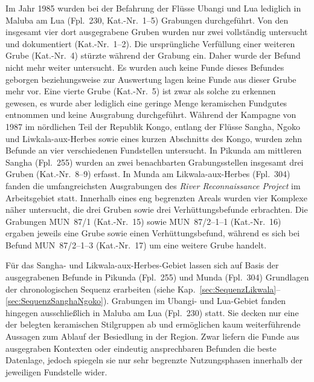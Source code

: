 Im Jahr 1985 wurden bei der Befahrung der Flüsse Ubangi und Lua lediglich in Maluba am Lua (Fpl.~230, Kat.-Nr.~1--5) Grabungen durchgeführt. Von den insgesamt vier dort ausgegrabene Gruben wurden nur zwei vollständig untersucht und dokumentiert (Kat.-Nr.~1--2). Die ursprüngliche Verfüllung einer weiteren Grube (Kat.-Nr.~4) stürzte während der Grabung ein. Daher wurde der Befund nicht mehr weiter untersucht. Es wurden auch keine Funde dieses Befundes geborgen beziehungsweise zur Auswertung lagen keine Funde aus dieser Grube mehr vor. Eine vierte Grube (Kat.-Nr.~5) ist zwar als solche zu erkennen gewesen, es wurde aber lediglich eine geringe Menge keramischen Fundgutes entnommen und keine Ausgrabung durchgeführt. Während der Kampagne von 1987 im nördlichen Teil der Republik Kongo, entlang der Flüsse Sangha, Ngoko und Liwkala-aux-Herbes sowie eines kurzen Abschnitts des Kongo, wurden zehn Befunde an vier verschiedenen Fundstellen untersucht. In Pikunda am mittleren Sangha (Fpl.~255) wurden an zwei benachbarten Grabungsstellen insgesamt drei Gruben (Kat.-Nr.~8--9) erfasst. In Munda am Likwala-aux-Herbes (Fpl.~304) fanden die umfangreichsten Ausgrabungen des \textit{River Reconnaissance Project} im Arbeitsgebiet statt. Innerhalb eines eng begrenzten Areals wurden vier Komplexe näher untersucht, die drei Gruben sowie drei Verhüttungsbefunde erbrachten. Die Grabungen MUN~87/1 (Kat.-Nr.~15) sowie MUN~87/2--1--1 (Kat.-Nr.~16) ergaben jeweils eine Grube sowie einen Verhüttungsbefund, während es sich bei Befund MUN~87/2--1--3 (Kat.-Nr.~17) um eine weitere Grube handelt.

Für das Sangha- und Likwala-aux-Herbes-Gebiet lassen sich auf Basis der ausgegrabenen Befunde in Pikunda (Fpl.~255) und Munda (Fpl.~304) Grundlagen der chronologischen Sequenz erarbeiten (siehe Kap.~\ref{sec:SequenzLikwala}--\ref{sec:SequenzSanghaNgoko}). Grabungen im Ubangi- und Lua-Gebiet fanden hingegen ausschließlich in Maluba am Lua (Fpl.~230) statt. Sie decken nur eine der belegten keramischen Stilgruppen ab und ermöglichen kaum weiterführende Aussagen zum Ablauf der Besiedlung in der Region. Zwar liefern die Funde aus ausgegraben Kontexten oder eindeutig ansprechbaren Befunden die beste Datenlage, jedoch spiegeln sie nur sehr begrenzte Nutzungsphasen innerhalb der jeweiligen Fundstelle wider.

